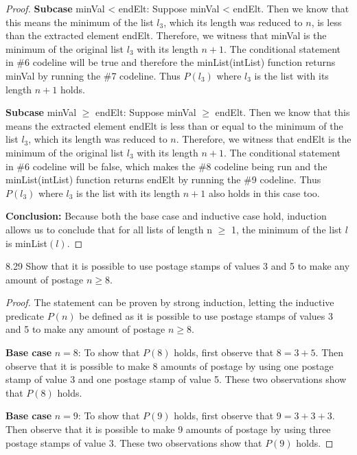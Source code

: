 \documentclass[10pt]{article}
\begin{document}
\begin{enumerate}[label={}]
\begin{proof}
              \textbf{Subcase }minVal < endElt: Suppose minVal < endElt. Then we know that this means the minimum of the list $l_3$, which its length was reduced to $n$, is less than the extracted element endElt. Therefore, we witness that minVal is the minimum of the original list $l_3$ with its length $n+1$. The conditional statement in \#6 codeline will be true and therefore the minList(intList) function returns minVal by running the \#7 codeline. Thus $P\left(l_3\right)$ where $l_3$ is the list with its length $n+1$ holds.


              \textbf{Subcase }minVal $\geq$ endElt: Suppose minVal $\geq$ endElt. Then we know that this means the extracted element endElt is less than or equal to the minimum of the list $l_3$, which its length was reduced to $n$. Therefore, we witness that endElt is the minimum of the original list $l_3$ with its length $n+1$. The conditional statement in \#6 codeline will be false, which makes the \#8 codeline being run and the minList(intList) function returns endElt by running the \#9 codeline. Thus $P\left(l_3\right)$ where $l_3$ is the list with its length $n+1$ also holds in this case too.

              \textbf{Conclusion:} Because both the base case and inductive case hold, induction allows us to conclude that for all lists of length n $\geq$ 1, the minimum of the list $l$ is minList$(l)$.

          \end{proof}

          8.29 Show that it is possible to use postage stamps of values 3 and 5 to make any amount of postage $n \geq 8$.
          \begin{proof}
              The statement can be proven by strong induction, letting the inductive predicate $P(n)$ be defined as it is possible to use postage stamps of values 3 and 5 to make any amount of postage $n \geq 8$.

              \textbf{Base case} $n = 8$: To show that $P(8)$ holds, first observe that $8=3+5$. Then observe that it is possible to make 8 amounts of postage by using one postage stamp of value 3 and one postage stamp of value 5. These two observations show that $P(8)$ holds.


              \textbf{Base case} $n = 9$: To show that $P(9)$ holds, first observe that $9=3+3+3$. Then observe that it is possible to make 9 amounts of postage by using three postage stamps of value 3. These two observations show that $P(9)$ holds.



\end{proof}
\end{enumerate}
\end{document}
